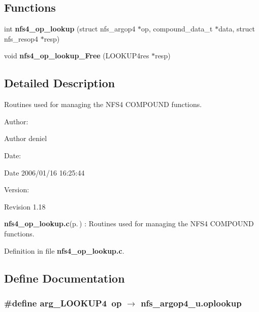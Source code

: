 \subsection*{Functions}
\begin{CompactItemize}
\item 
int {\bf nfs4\_\-op\_\-lookup} (struct nfs\_\-argop4 $\ast$op, compound\_\-data\_\-t $\ast$data, struct nfs\_\-resop4 $\ast$resp)
\item 
void {\bf nfs4\_\-op\_\-lookup\_\-Free} (LOOKUP4res $\ast$resp)
\end{CompactItemize}


\subsection{Detailed Description}
Routines used for managing the NFS4 COMPOUND functions. 

\begin{Desc}
\item[Author:]\begin{Desc}
\item[Author]deniel \end{Desc}
\end{Desc}
\begin{Desc}
\item[Date:]\begin{Desc}
\item[Date]2006/01/16 16:25:44 \end{Desc}
\end{Desc}
\begin{Desc}
\item[Version:]\begin{Desc}
\item[Revision]1.18 \end{Desc}
\end{Desc}
{\bf nfs4\_\-op\_\-lookup.c}{\rm (p.\,\pageref{nfs4__op__lookup_8c})} : Routines used for managing the NFS4 COMPOUND functions.

Definition in file {\bf nfs4\_\-op\_\-lookup.c}.

\subsection{Define Documentation}
\subsubsection{\setlength{\rightskip}{0pt plus 5cm}\#define arg\_\-LOOKUP4\ op $\rightarrow$ nfs\_\-argop4\_\-u.oplookup}\label{nfs4__op__lookup_8c_a0}


